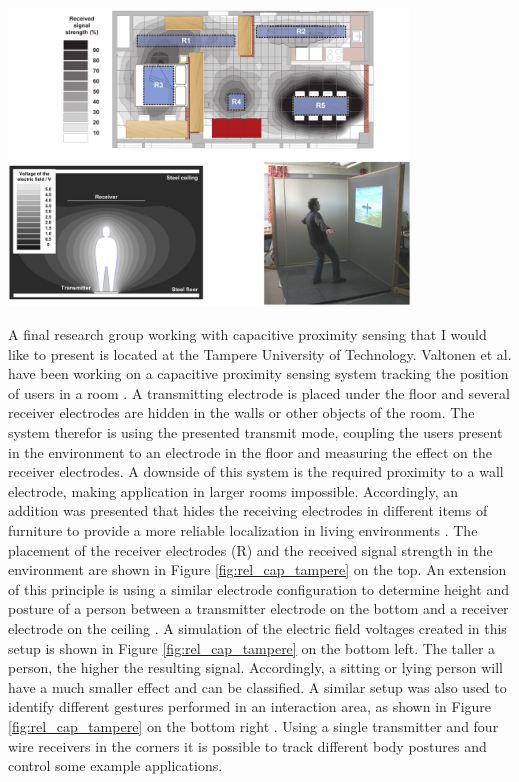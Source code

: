 \begin{minipage}{\linewidth}
\centering
\includegraphics[width=0.8\textwidth]{images/rel_cap_tampere}
\label{fig:rel_cap_tampere}
\end{minipage}

A final research group working with capacitive proximity sensing that I would like to present is located at the Tampere University of Technology. Valtonen et al. have been working on a capacitive proximity sensing system tracking the position of users in a room \cite{Valtonen2009a,valtonen2012capacitive}. A transmitting electrode is placed under the floor and several receiver electrodes are hidden in the walls or other objects of the room. The system therefor is using the presented transmit mode, coupling the users present in the environment to an electrode in the floor and measuring the effect on the receiver electrodes. A downside of this system is the required proximity to a wall electrode, making application in larger rooms impossible. Accordingly, an addition was presented that hides the receiving electrodes in different items of furniture to provide a more reliable localization in living environments \cite{valtonen2012capacitive}. The placement of the receiver electrodes (R) and the received signal strength in the environment are shown in Figure \ref{fig:rel_cap_tampere} on the top. An extension of this principle is using a similar electrode configuration to  determine height and posture of a person between a transmitter electrode on the bottom and a receiver electrode on the ceiling \cite{valtonen2011unobtrusive}. A simulation of the electric field voltages created in this setup is shown in Figure \ref{fig:rel_cap_tampere} on the bottom left. The taller a person, the higher the resulting signal. Accordingly, a sitting or lying person will have a much smaller effect and can be classified. A similar setup was also used to identify different gestures performed in an interaction area, as shown in Figure \ref{fig:rel_cap_tampere} on the bottom right \cite{valtonen2010human}. Using a single transmitter and four wire receivers in the corners it is possible to track different body postures and control some example applications.

